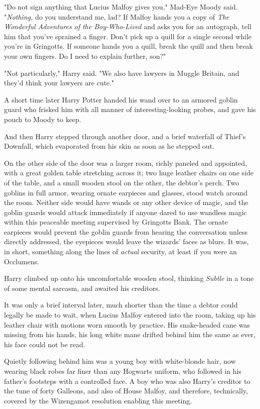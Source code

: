 "Do not sign anything that Lucius Malfoy gives you," Mad-Eye Moody said. 
"\emph{Nothing,} do you understand me, lad? If Malfoy hands you a copy of 
\emph{The Wonderful Adventures of the Boy-Who-Lived} and asks you for an 
autograph, tell him that you've sprained a finger. Don't pick up a quill for a 
single second while you're in Gringotts. If someone hands you a quill, break 
the quill and then break your own fingers. Do I need to explain further, son?"

"Not particularly," Harry said. "We also have lawyers in Muggle Britain, and 
they'd think your lawyers are cute."

A short time later Harry Potter handed his wand over to an armored goblin guard 
who frisked him with all manner of interesting-looking probes, and gave his 
pouch to Moody to keep.

And then Harry stepped through another door, and a brief waterfall of Thief's 
Downfall, which evaporated from his skin as soon as he stepped out.

On the other side of the door was a larger room, richly paneled and appointed, 
with a great golden table stretching across it; two huge leather chairs on one 
side of the table, and a small wooden stool on the other, the debtor's perch. 
Two goblins in full armor, wearing ornate earpieces and glasses, stood watch 
around the room. Neither side would have wands or any other device of magic, 
and the goblin guards would attack immediately if anyone dared to use wandless 
magic within this peaceable meeting supervised by Gringotts Bank. The ornate 
earpieces would prevent the goblin guards from hearing the conversation unless 
directly addressed, the eyepieces would leave the wizards' faces as blurs. It 
was, in short, something along the lines of \emph{actual} security, at least if 
you were an Occlumens.

Harry climbed up onto his uncomfortable wooden stool, thinking \emph{Subtle} in 
a tone of some mental sarcasm, and awaited his creditors.

It was only a brief interval later, much shorter than the time a debtor could 
legally be made to wait, when Lucius Malfoy entered into the room, taking up 
his leather chair with motions worn smooth by practice. His snake-headed cane 
was missing from his hands, his long white mane drifted behind him the same as 
ever, his face could not be read.

Quietly following behind him was a young boy with white-blonde hair, now 
wearing black robes far finer than any Hogwarts uniform, who followed in his 
father's footsteps with a controlled face. A boy who was also Harry's creditor 
to the tune of forty Galleons, and also of House Malfoy, and therefore, 
technically, covered by the Wizengamot resolution enabling this meeting.

